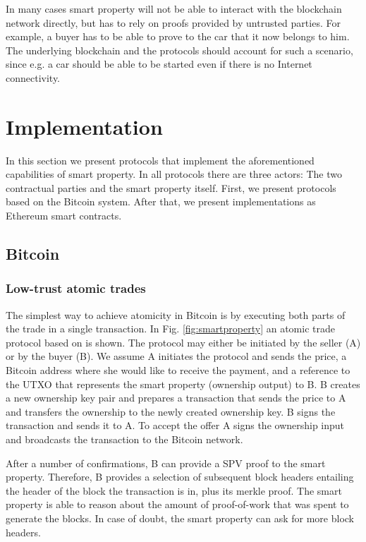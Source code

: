 In many cases smart property will not be able to interact with the blockchain network directly, but has to rely on proofs provided by untrusted parties. For example, a buyer has to be able to prove to the car that it now belongs to him. The underlying blockchain and the protocols should account for such a scenario, since e.g. a car should be able to be started even if there is no Internet connectivity.

\section{Implementation}

In this section we present protocols that implement the aforementioned capabilities of smart property. In all protocols there are three actors: The two contractual parties and the smart property itself. First, we present protocols based on the Bitcoin system. After that, we present implementations as Ethereum smart contracts. 

\subsection{Bitcoin}

\subsubsection{Low-trust atomic trades}

The simplest way to achieve atomicity in Bitcoin is by executing both parts of the trade in a single transaction. In Fig. \ref{fig:smartproperty} an atomic trade protocol based on \cite{smartproperty2011} is shown. The protocol may either be initiated by the seller (A) or by the buyer (B). We assume A initiates the protocol and sends the price, a Bitcoin address where she would like to receive the payment, and a reference to the UTXO that represents the smart property (ownership output) to B. B creates a new ownership key pair and prepares a transaction that sends the price to A and transfers the ownership to the newly created ownership key. B signs the transaction and sends it to A. To accept the offer A signs the ownership input and broadcasts the transaction to the Bitcoin network. 

After a number of confirmations, B can provide a SPV proof to the smart property. Therefore, B provides a selection of subsequent block headers entailing the header of the block the transaction is in, plus its merkle proof. The smart property is able to reason about the amount of proof-of-work that was spent to generate the blocks. In case of doubt, the smart property can ask for more block headers.

